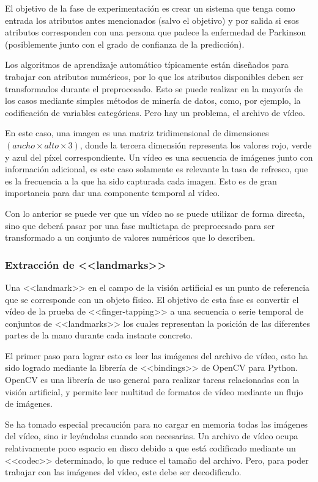 El objetivo de la fase de experimentación es crear un sistema que tenga como
entrada los atributos antes mencionados (salvo el objetivo) y por salida si esos
atributos corresponden con una persona que padece la enfermedad de Parkinson
(posiblemente junto con el grado de confianza de la predicción).

Los algoritmos de aprendizaje automático típicamente están diseñados para
trabajar con atributos numéricos, por lo que los atributos disponibles deben ser
transformados durante el preprocesado. Esto se puede realizar en la mayoría de
los casos mediante simples métodos de minería de datos, como, por ejemplo, la
codificación de variables categóricas. Pero hay un problema, el archivo de
vídeo.

En este caso, una imagen es una matriz tridimensional de dimensiones
$(ancho \times alto \times 3)$, donde la tercera dimensión representa los valores
rojo, verde y azul del píxel correspondiente. Un vídeo es una secuencia de
imágenes junto con información adicional, es este caso solamente es relevante la
tasa de refresco, que es la frecuencia a la que ha sido capturada cada imagen.
Esto es de gran importancia para dar una componente temporal al vídeo.

Con lo anterior se puede ver que un vídeo no se puede utilizar de forma directa,
sino que deberá pasar por una fase multietapa de preprocesado para ser
transformado a un conjunto de valores numéricos que lo describen.

\subsubsection{Extracción de <<landmarks>>}

Una <<landmark>> en el campo de la visión artificial es un punto de referencia
que se corresponde con un objeto físico. El objetivo de esta fase es convertir
el vídeo de la prueba de <<finger-tapping>> a una secuencia o serie temporal de
conjuntos de <<landmarks>> los cuales representan la posición de las diferentes
partes de la mano durante cada instante concreto.

El primer paso para lograr esto es leer las imágenes del archivo de vídeo, esto
ha sido logrado mediante la librería de <<bindings>> de OpenCV para Python.
OpenCV es una librería de uso general para realizar tareas relacionadas con la
visión artificial, y permite leer multitud de formatos de vídeo mediante un
flujo de imágenes.

Se ha tomado especial precaución para no cargar en memoria todas las imágenes
del vídeo, sino ir leyéndolas cuando son necesarias. Un archivo de vídeo ocupa
relativamente poco espacio en disco debido a que está codificado mediante un
<<codec>> determinado, lo que reduce el tamaño del archivo. Pero, para poder
trabajar con las imágenes del vídeo, este debe ser decodificado.

